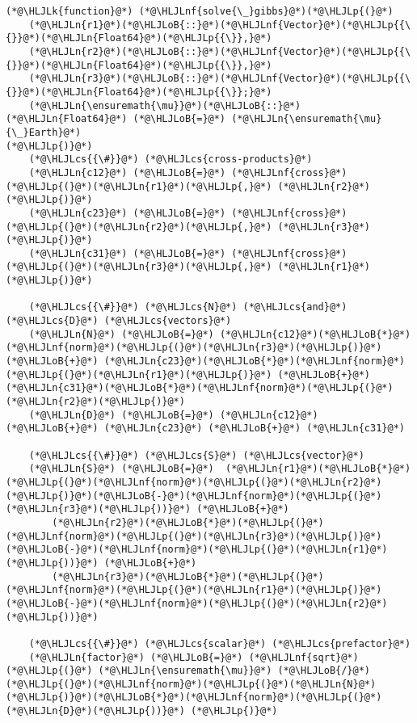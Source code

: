 \documentclass[12pt,a4paper]{article}
\newcommand{\HLJLk}[1]{\textcolor[RGB]{148,91,176}{\textbf{#1}}}
\newcommand{\HLJLn}[1]{#1}
\newcommand{\HLJLnf}[1]{\textcolor[RGB]{66,102,213}{#1}}
\newcommand{\HLJLoB}[1]{\textcolor[RGB]{102,102,102}{\textbf{#1}}}
\newcommand{\HLJLp}[1]{#1}
\newcommand{\HLJLcs}[1]{\textcolor[RGB]{153,153,119}{\textit{#1}}}
\begin{document}
\begin{lstlisting}
(*@\HLJLk{function}@*) (*@\HLJLnf{solve{\_}gibbs}@*)(*@\HLJLp{(}@*)
	(*@\HLJLn{r1}@*)(*@\HLJLoB{::}@*)(*@\HLJLnf{Vector}@*)(*@\HLJLp{{\{}}@*)(*@\HLJLn{Float64}@*)(*@\HLJLp{{\}},}@*)
	(*@\HLJLn{r2}@*)(*@\HLJLoB{::}@*)(*@\HLJLnf{Vector}@*)(*@\HLJLp{{\{}}@*)(*@\HLJLn{Float64}@*)(*@\HLJLp{{\}},}@*)
	(*@\HLJLn{r3}@*)(*@\HLJLoB{::}@*)(*@\HLJLnf{Vector}@*)(*@\HLJLp{{\{}}@*)(*@\HLJLn{Float64}@*)(*@\HLJLp{{\}};}@*)
	(*@\HLJLn{\ensuremath{\mu}}@*)(*@\HLJLoB{::}@*)(*@\HLJLn{Float64}@*) (*@\HLJLoB{=}@*) (*@\HLJLn{\ensuremath{\mu}{\_}Earth}@*)
(*@\HLJLp{)}@*)
	(*@\HLJLcs{{\#}}@*) (*@\HLJLcs{cross‐products}@*)
	(*@\HLJLn{c12}@*) (*@\HLJLoB{=}@*) (*@\HLJLnf{cross}@*)(*@\HLJLp{(}@*)(*@\HLJLn{r1}@*)(*@\HLJLp{,}@*) (*@\HLJLn{r2}@*)(*@\HLJLp{)}@*)
	(*@\HLJLn{c23}@*) (*@\HLJLoB{=}@*) (*@\HLJLnf{cross}@*)(*@\HLJLp{(}@*)(*@\HLJLn{r2}@*)(*@\HLJLp{,}@*) (*@\HLJLn{r3}@*)(*@\HLJLp{)}@*)
	(*@\HLJLn{c31}@*) (*@\HLJLoB{=}@*) (*@\HLJLnf{cross}@*)(*@\HLJLp{(}@*)(*@\HLJLn{r3}@*)(*@\HLJLp{,}@*) (*@\HLJLn{r1}@*)(*@\HLJLp{)}@*)

	(*@\HLJLcs{{\#}}@*) (*@\HLJLcs{N}@*) (*@\HLJLcs{and}@*) (*@\HLJLcs{D}@*) (*@\HLJLcs{vectors}@*)
	(*@\HLJLn{N}@*) (*@\HLJLoB{=}@*) (*@\HLJLn{c12}@*)(*@\HLJLoB{*}@*)(*@\HLJLnf{norm}@*)(*@\HLJLp{(}@*)(*@\HLJLn{r3}@*)(*@\HLJLp{)}@*) (*@\HLJLoB{+}@*) (*@\HLJLn{c23}@*)(*@\HLJLoB{*}@*)(*@\HLJLnf{norm}@*)(*@\HLJLp{(}@*)(*@\HLJLn{r1}@*)(*@\HLJLp{)}@*) (*@\HLJLoB{+}@*) (*@\HLJLn{c31}@*)(*@\HLJLoB{*}@*)(*@\HLJLnf{norm}@*)(*@\HLJLp{(}@*)(*@\HLJLn{r2}@*)(*@\HLJLp{)}@*)
	(*@\HLJLn{D}@*) (*@\HLJLoB{=}@*) (*@\HLJLn{c12}@*) (*@\HLJLoB{+}@*) (*@\HLJLn{c23}@*) (*@\HLJLoB{+}@*) (*@\HLJLn{c31}@*)

	(*@\HLJLcs{{\#}}@*) (*@\HLJLcs{S}@*) (*@\HLJLcs{vector}@*)
	(*@\HLJLn{S}@*) (*@\HLJLoB{=}@*)  (*@\HLJLn{r1}@*)(*@\HLJLoB{*}@*)(*@\HLJLp{(}@*)(*@\HLJLnf{norm}@*)(*@\HLJLp{(}@*)(*@\HLJLn{r2}@*)(*@\HLJLp{)}@*)(*@\HLJLoB{-}@*)(*@\HLJLnf{norm}@*)(*@\HLJLp{(}@*)(*@\HLJLn{r3}@*)(*@\HLJLp{))}@*) (*@\HLJLoB{+}@*)
		(*@\HLJLn{r2}@*)(*@\HLJLoB{*}@*)(*@\HLJLp{(}@*)(*@\HLJLnf{norm}@*)(*@\HLJLp{(}@*)(*@\HLJLn{r3}@*)(*@\HLJLp{)}@*)(*@\HLJLoB{-}@*)(*@\HLJLnf{norm}@*)(*@\HLJLp{(}@*)(*@\HLJLn{r1}@*)(*@\HLJLp{))}@*) (*@\HLJLoB{+}@*)
		(*@\HLJLn{r3}@*)(*@\HLJLoB{*}@*)(*@\HLJLp{(}@*)(*@\HLJLnf{norm}@*)(*@\HLJLp{(}@*)(*@\HLJLn{r1}@*)(*@\HLJLp{)}@*)(*@\HLJLoB{-}@*)(*@\HLJLnf{norm}@*)(*@\HLJLp{(}@*)(*@\HLJLn{r2}@*)(*@\HLJLp{))}@*)

	(*@\HLJLcs{{\#}}@*) (*@\HLJLcs{scalar}@*) (*@\HLJLcs{prefactor}@*)
	(*@\HLJLn{factor}@*) (*@\HLJLoB{=}@*) (*@\HLJLnf{sqrt}@*)(*@\HLJLp{(}@*) (*@\HLJLn{\ensuremath{\mu}}@*) (*@\HLJLoB{/}@*) (*@\HLJLp{(}@*)(*@\HLJLnf{norm}@*)(*@\HLJLp{(}@*)(*@\HLJLn{N}@*)(*@\HLJLp{)}@*)(*@\HLJLoB{*}@*)(*@\HLJLnf{norm}@*)(*@\HLJLp{(}@*)(*@\HLJLn{D}@*)(*@\HLJLp{))}@*) (*@\HLJLp{)}@*)


\end{lstlisting}
\end{document}
